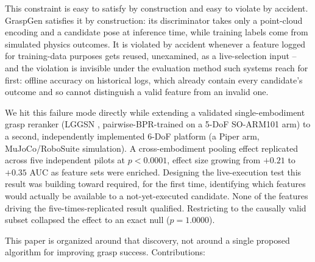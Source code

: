 \documentclass[journal]{IEEEtran}
\begin{document}
This constraint is easy to satisfy by construction and easy to violate by
accident. GraspGen \cite{graspgen2025} satisfies it by construction: its
discriminator takes only a point-cloud encoding and a candidate pose at
inference time, while training labels come from simulated physics
outcomes. It is violated by accident whenever a feature logged for
training-data purposes gets reused, unexamined, as a live-selection input
-- and the violation is invisible under the evaluation method such systems
reach for first: offline accuracy on historical logs, which already
contain every candidate's outcome and so cannot distinguish a valid
feature from an invalid one.

We hit this failure mode directly while extending a validated
single-embodiment grasp reranker (LGGSN \cite{lggsn_ral_under_review},
pairwise-BPR-trained on a 5-DoF SO-ARM101 arm) to a second, independently
implemented 6-DoF platform (a Piper arm, MuJoCo/RoboSuite simulation). A
cross-embodiment pooling effect replicated across five independent
pilots at $p{<}0.0001$, effect size growing from $+0.21$ to $+0.35$ AUC as
feature sets were enriched. Designing the live-execution test this result
was building toward required, for the first time, identifying which
features would actually be available to a not-yet-executed candidate.
None of the features driving the five-times-replicated result qualified.
Restricting to the causally valid subset collapsed the effect to an exact
null ($p{=}1.0000$).

This paper is organized around that discovery, not around a single
proposed algorithm for improving grasp success. Contributions:
\end{document}

